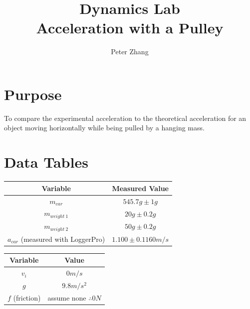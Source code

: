 \documentclass[12pt]{article}
\title{Dynamics Lab\\Acceleration with a Pulley}
\author{Peter Zhang}
\begin{document}
\maketitle
\newpage


\section{Purpose}
To compare the experimental acceleration to the theoretical acceleration for an object moving horizontally while being pulled by a hanging mass.

\section{Data Tables}

\begin{center}
	\begin{tabular}{|c|c|}
		\hline
		Variable & Measured Value\\
		\hline \hline
		$m_{car}$ & $545.7g\pm1g$\\
		\hline
		$m_{weight\ 1}$ & $20g\pm0.2g$\\
		\hline
		$m_{weight\ 2}$ & $50g\pm0.2g$\\
		\hline
		$a_{car}$ (measured with LoggerPro) & $1.100\pm0.1160m/s$\\
		\hline
	\end{tabular}
\end{center}

\begin{center}
	\begin{tabular}{|c|c|}
		\hline
		Variable & Value\\
		\hline \hline
		$v_{i}$ & $0m/s$\\
		\hline
		$g$ & $9.8m/s^2$\\
		\hline
		$f$ (friction) & assume none $\therefore{0N}$\\
		\hline
	\end{tabular}
\end{center}

\begin{figure}[H]
	\centering
\end{figure}
\end{document}
